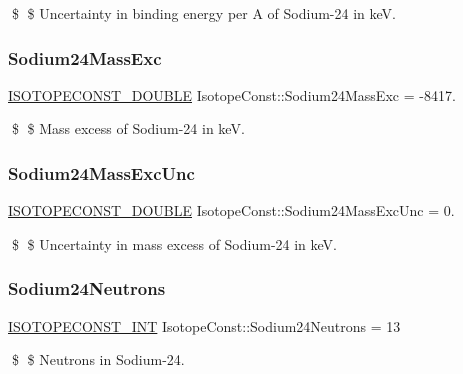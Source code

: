 \$ \$ Uncertainty in binding energy per A of Sodium-\/24 in keV. \mbox{\label{group___isotope_const-_sodium-_na24_ga7f5151cbc797e4ee72db910c46bb6147}} 
\subsubsection{\texorpdfstring{Sodium24\+Mass\+Exc}{Sodium24MassExc}}
{\footnotesize\ttfamily \mbox{\hyperlink{group___isotope_const-_macros_ga8f45a7272ce02c0b4c65c44636ed719a}{I\+S\+O\+T\+O\+P\+E\+C\+O\+N\+S\+T\+\_\+\+D\+O\+U\+B\+LE}} Isotope\+Const\+::\+Sodium24\+Mass\+Exc = -\/8417.}

\$ \$ Mass excess of Sodium-\/24 in keV. \mbox{\label{group___isotope_const-_sodium-_na24_gaaac40e1dbbc92ab24cf280d691c58843}} 
\subsubsection{\texorpdfstring{Sodium24\+Mass\+Exc\+Unc}{Sodium24MassExcUnc}}
{\footnotesize\ttfamily \mbox{\hyperlink{group___isotope_const-_macros_ga8f45a7272ce02c0b4c65c44636ed719a}{I\+S\+O\+T\+O\+P\+E\+C\+O\+N\+S\+T\+\_\+\+D\+O\+U\+B\+LE}} Isotope\+Const\+::\+Sodium24\+Mass\+Exc\+Unc = 0.}

\$ \$ Uncertainty in mass excess of Sodium-\/24 in keV. \mbox{\label{group___isotope_const-_sodium-_na24_ga853191ab0a0f520b894e36bb4ab803a5}} 
\subsubsection{\texorpdfstring{Sodium24\+Neutrons}{Sodium24Neutrons}}
{\footnotesize\ttfamily \mbox{\hyperlink{group___isotope_const-_macros_ga5f18360b3e99483a35c32d789e62621c}{I\+S\+O\+T\+O\+P\+E\+C\+O\+N\+S\+T\+\_\+\+I\+NT}} Isotope\+Const\+::\+Sodium24\+Neutrons = 13}

\$ \$ Neutrons in Sodium-\/24. \mbox{\label{group___isotope_const-_sodium-_na24_ga3922c66be700d0cef1dd8de1743c5f6f}} 
